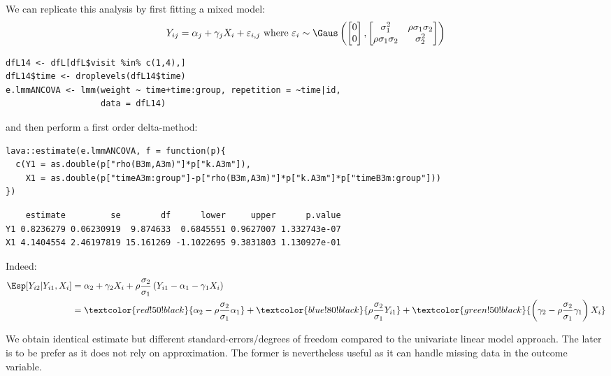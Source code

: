 \documentclass[12pt]{article}
\newcommand{\darkblue}{blue!80!black}
\newcommand{\darkgreen}{green!50!black}
\newcommand{\darkred}{red!50!black}
\begin{document}
We can replicate this analysis by first fitting a mixed model:
\[ Y_{ij} = \alpha_j + \gamma_j X_{i} + \varepsilon_{i,j} \text{ where } \varepsilon_i \sim \Gaus \left( \begin{bmatrix} 0 \\ 0 \end{bmatrix}, \begin{bmatrix} \sigma^2_1 & \rho \sigma_1 \sigma_2 \\ \rho \sigma_1 \sigma_2 & \sigma^2_2 \end{bmatrix} \right) \]
\lstset{language=r,label= ,caption= ,captionpos=b,numbers=none}
\begin{lstlisting}
dfL14 <- dfL[dfL$visit %in% c(1,4),]
dfL14$time <- droplevels(dfL14$time)
e.lmmANCOVA <- lmm(weight ~ time+time:group, repetition = ~time|id,
                   data = dfL14)
\end{lstlisting}

and then perform a first order delta-method:
\lstset{language=r,label= ,caption= ,captionpos=b,numbers=none}
\begin{lstlisting}
lava::estimate(e.lmmANCOVA, f = function(p){
  c(Y1 = as.double(p["rho(B3m,A3m)"]*p["k.A3m"]),
    X1 = as.double(p["timeA3m:group"]-p["rho(B3m,A3m)"]*p["k.A3m"]*p["timeB3m:group"]))
})
\end{lstlisting}

\begin{verbatim}
    estimate         se        df      lower     upper      p.value
Y1 0.8236279 0.06230919  9.874633  0.6845551 0.9627007 1.332743e-07
X1 4.1404554 2.46197819 15.161269 -1.1022695 9.3831803 1.130927e-01
\end{verbatim}


Indeed:
\begin{align*}
\Esp[Y_{i2}|Y_{i1},X_{i}] &= \alpha_2 + \gamma_2 X_{i} + \rho \frac{\sigma_2}{\sigma_1}\left(Y_{i1} - \alpha_1 - \gamma_1 X_{i}\right) \\
                         &= \textcolor{\darkred}{\alpha_2 - \rho \frac{\sigma_2}{\sigma_1} \alpha_1}
                         + \textcolor{\darkblue}{\rho \frac{\sigma_2}{\sigma_1}Y_{i1}}
                         + \textcolor{\darkgreen}{\left(\gamma_2 - \rho \frac{\sigma_2}{\sigma_1} \gamma_1\right)  X_{i} }
\end{align*}

We obtain identical estimate but different standard-errors/degrees of
freedom compared to the univariate linear model approach. The later is
to be prefer as it does not rely on approximation. The former is
nevertheless useful as it can handle missing data in the outcome
variable.
\end{document}

